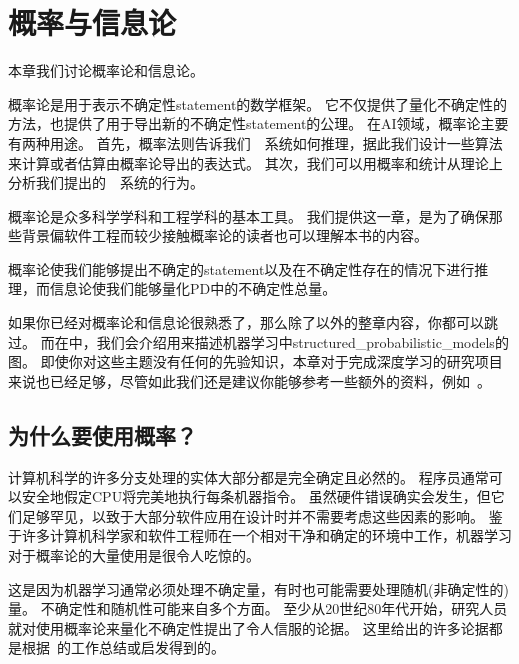 \chapter{概率与信息论}
\label{chap:probability_and_information_theory}

本章我们讨论概率论和信息论。

概率论是用于表示不确定性\gls{statement}的数学框架。
它不仅提供了量化不确定性的方法，也提供了用于导出新的不确定性\gls{statement}的公理。
在\gls{AI}领域，概率论主要有两种用途。
首先，概率法则告诉我们~~系统如何推理，据此我们设计一些算法来计算或者估算由概率论导出的表达式。
其次，我们可以用概率和统计从理论上分析我们提出的~~系统的行为。

概率论是众多科学学科和工程学科的基本工具。
我们提供这一章，是为了确保那些背景偏软件工程而较少接触概率论的读者也可以理解本书的内容。

概率论使我们能够提出不确定的\gls{statement}以及在不确定性存在的情况下进行推理，而信息论使我们能够量化\gls{PD}中的不确定性总量。

如果你已经对概率论和信息论很熟悉了，那么除了以外的整章内容，你都可以跳过。
而在中，我们会介绍用来描述机器学习中\gls{structured_probabilistic_models}的图。
即使你对这些主题没有任何的先验知识，本章对于完成深度学习的研究项目来说也已经足够，尽管如此我们还是建议你能够参考一些额外的资料，例如~\cite{Jaynes03}。


\section{为什么要使用概率？}
\label{sec:why_probability}

计算机科学的许多分支处理的实体大部分都是完全确定且必然的。
程序员通常可以安全地假定CPU将完美地执行每条机器指令。
虽然硬件错误确实会发生，但它们足够罕见，以致于大部分软件应用在设计时并不需要考虑这些因素的影响。
鉴于许多计算机科学家和软件工程师在一个相对干净和确定的环境中工作，机器学习对于概率论的大量使用是很令人吃惊的。

这是因为机器学习通常必须处理不确定量，有时也可能需要处理随机(非确定性的)量。
不确定性和随机性可能来自多个方面。
至少从20世纪80年代开始，研究人员就对使用概率论来量化不确定性提出了令人信服的论据。
这里给出的许多论据都是根据~\cite{Pearl88}的工作总结或启发得到的。

